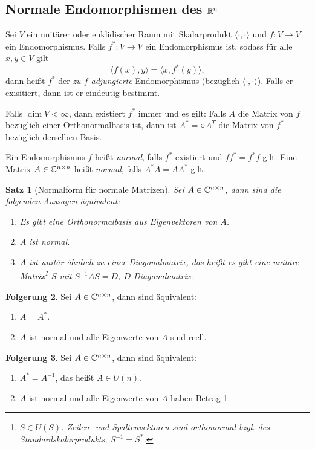 \documentclass[
 a4paper,
 12pt,
 parskip=half
 ]{scrartcl}
\theoremstyle{plain}
\newtheorem{thm}{Satz}[section] %
\theoremstyle{definition}
\newtheorem{folg}[thm]{Folgerung}
\begin{document}
\subsection*{Normale Endomorphismen des $\mathbb{R}^n$}
\begin{mydef}
Sei $V$ ein unitärer oder euklidischer Raum mit Skalarprodukt $\langle \cdot, \cdot \rangle$ und $f:V \to V$ ein Endomorphismus. Falls $f^*:V \to V$ ein Endomorphismus ist, sodass für alle $x,y \in V$ gilt
\[ \langle f(x), y \rangle = \langle x, f^*(y) \rangle, \]
dann heißt $f^*$ der \emph{zu $f$ adjungierte} Endomorphismus (bezüglich $\langle \cdot, \cdot \rangle$). Falls er exisitiert, dann ist er eindeutig bestimmt.

Falls $\dim V < \infty$, dann existiert $f^*$ immer und es gilt: Falls $A$ die Matrix von $f$ bezüglich einer Orthonormalbasis ist, dann ist $A^* = \obar{A}^T$ die Matrix von $f^*$ bezüglich derselben Basis.

Ein Endomorphismus $f$ heißt \emph{normal}, falls $f^*$ existiert und $f f^* = f^* f$ gilt. Eine Matrix $A \in \mathbb{C}^{n \times n}$ heißt \emph{normal}, falls $A^* A = A A^*$ gilt.
\end{mydef}

\begin{thm}[Normalform für normale Matrizen]
 Sei $A \in \mathbb{C}^{n \times n}$, dann sind die folgenden Aussagen äquivalent:
 \begin{enumerate}[(1)]
  \item Es gibt eine Orthonormalbasis aus Eigenvektoren von $A$.
  \item $A$ ist normal.
  \item $A$ ist unitär ähnlich zu einer Diagonalmatrix, das heißt es gibt eine unitäre Matrix\footnote{$S \in U(S)$: Zeilen- und Spaltenvektoren sind orthonormal bzgl. des Standardskalarprodukts, $S^{-1} = S^*$.} $S$ mit $S^{-1} A S = D$, $D$ Diagonalmatrix.
 \end{enumerate}
\end{thm}

\begin{folg}
 Sei $A \in \mathbb{C}^{n \times n}$, dann sind äquivalent:
 \begin{enumerate}[(1)]
  \item $A = A^*$.
  \item $A$ ist normal und alle Eigenwerte von $A$ sind reell.
 \end{enumerate}
\end{folg}

\begin{folg}
 Sei $A \in \mathbb{C}^{n \times n}$, dann sind äquivalent:
 \begin{enumerate}[(1)]
  \item $A^* = A^{-1}$, das heißt $A \in U(n)$.
  \item $A$ ist normal und alle Eigenwerte von $A$ haben Betrag 1.
 \end{enumerate}
\end{folg}
\end{document}
